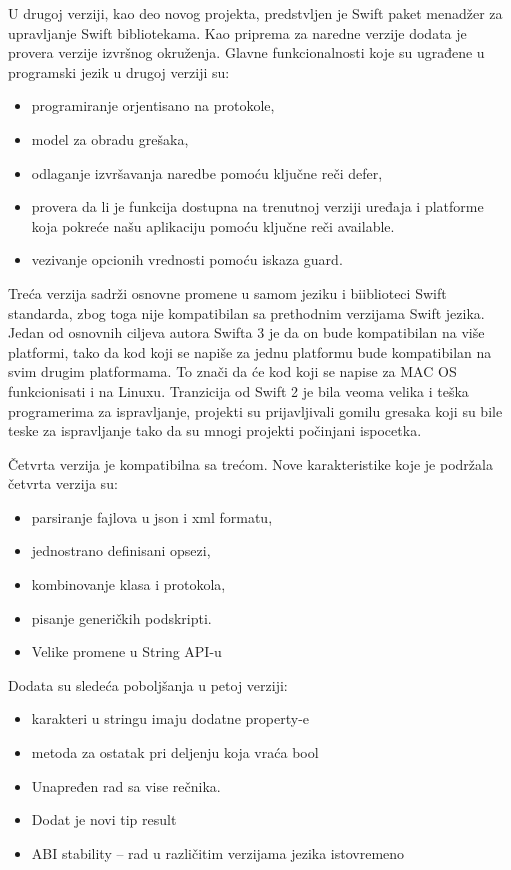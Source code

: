 \documentclass[a4paper]{article}
\begin{document}
U drugoj verziji, kao deo novog projekta, predstvljen je Swift paket menadžer za upravljanje Swift bibliotekama. Kao priprema za naredne verzije dodata je provera verzije izvršnog okruženja. Glavne funkcionalnosti koje su ugrađene u programski jezik u drugoj verziji su:
\begin{itemize}
\item programiranje orjentisano na protokole,
\item model za obradu grešaka,
\item odlaganje izvršavanja naredbe pomoću ključne reči defer,
\item provera da li je funkcija dostupna na trenutnoj verziji uređaja i platforme koja pokreće našu aplikaciju pomoću ključne reči available.
\item vezivanje opcionih  vrednosti pomoću iskaza guard. 
\end{itemize}

Treća verzija sadrži osnovne promene u samom jeziku i biiblioteci Swift standarda, zbog toga nije kompatibilan sa prethodnim verzijama Swift jezika. Jedan od osnovnih ciljeva autora Swifta 3 je da on bude kompatibilan na više platformi, tako da kod koji se napiše za jednu platformu bude kompatibilan na svim drugim platformama. To znači da će kod koji se napise za MAC OS funkcionisati i na Linuxu. Tranzicija od Swift 2 je bila veoma velika i teška programerima za ispravljanje, projekti su prijavljivali gomilu gresaka koji su bile teske za ispravljanje tako da su mnogi projekti počinjani ispocetka.

Četvrta verzija je kompatibilna sa trećom. Nove karakteristike koje je podržala četvrta verzija su:
\begin{itemize}
\item parsiranje fajlova u json i xml formatu,
\item jednostrano definisani opsezi,
\item kombinovanje klasa i protokola,
\item pisanje generičkih podskripti.
\item Velike promene u String API-u
\end{itemize}

Dodata su sledeća poboljšanja u petoj verziji:
\begin{itemize}
\item karakteri u stringu imaju dodatne property-e
\item metoda za ostatak pri deljenju koja vraća bool
\item Unapređen rad sa vise rečnika.
\item Dodat je novi tip result 
\item ABI stability – rad u različitim verzijama jezika istovremeno
\end{itemize}
  
\end{document}
